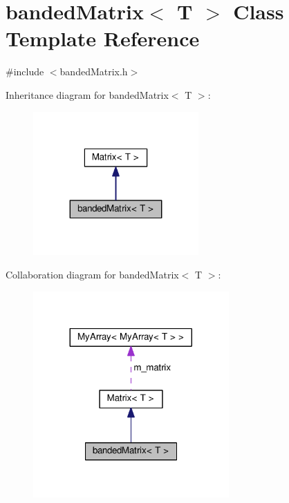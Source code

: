 \hypertarget{classbandedMatrix}{}\section{banded\+Matrix$<$ T $>$ Class Template Reference}
\label{classbandedMatrix}


{\ttfamily \#include $<$banded\+Matrix.\+h$>$}



Inheritance diagram for banded\+Matrix$<$ T $>$\+:\nopagebreak
\begin{figure}[H]
\begin{center}
\leavevmode
\includegraphics[width=179pt]{classbandedMatrix__inherit__graph}
\end{center}
\end{figure}


Collaboration diagram for banded\+Matrix$<$ T $>$\+:\nopagebreak
\begin{figure}[H]
\begin{center}
\leavevmode
\includegraphics[width=212pt]{classbandedMatrix__coll__graph}
\end{center}
\end{figure}
